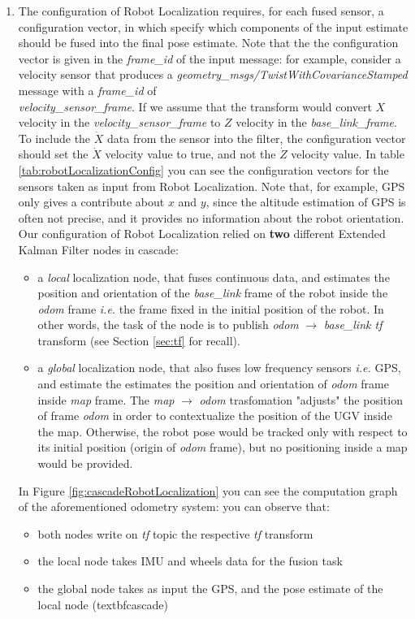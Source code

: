 \begin{enumerate}
	\item The configuration of Robot Localization requires, for each fused sensor, a configuration vector, in which specify which components of the input estimate should be fused into the final pose estimate. Note that the the configuration vector is given in the \textit{frame\_id} of the input message: for example, consider a velocity sensor that produces a \textit{geometry\_msgs/TwistWithCovarianceStamped} message with a \textit{frame\_id} of \\ \textit{velocity\_sensor\_frame}. If we assume that the transform would convert $X$ velocity in the \textit{velocity\_sensor\_frame} to $Z$ velocity in the \textit{base\_link\_frame}. To include the $\dot{X}$ data from the sensor into the filter, the configuration vector should set the $\dot{X}$ velocity value to true, and not the $\dot{Z}$ velocity value. In table \ref{tab:robotLocalizationConfig} you can see the configuration vectors for the sensors taken as input from Robot Localization. Note that, for example, GPS only gives a contribute about $x$ and $y$, since the altitude estimation of GPS is often not precise, and it provides no information about the robot orientation. Our configuration of Robot Localization relied on \textbf{two} different Extended Kalman Filter nodes in cascade:
	\begin{itemize}
		\item a \textit{local} localization node, that fuses continuous data, and estimates the position and orientation of the \textit{base\_link} frame of the robot inside the \textit{odom} frame \textit{i.e.} the frame fixed in the initial position of the robot. In other words, the task of the node is to publish \textit{odom} $\rightarrow$ \textit{base\_link tf} transform (see Section \ref{sec:tf} for recall). 
		\item a \textit{global} localization node, that also fuses low frequency sensors \textit{i.e.} GPS, and estimate the estimates the position and orientation of \textit{odom} frame inside \textit{map} frame. The \textit{map} $\rightarrow$ \textit{odom} trasfomation "adjusts" the position of frame \textit{odom} in order to contextualize the position of the \ac{UGV} inside the map. Otherwise, the robot pose would be tracked only with respect to its initial position (origin of \textit{odom} frame), but no positioning inside a map would be provided.
 	\end{itemize}
In Figure \ref{fig:cascadeRobotLocalization} you can see the computation graph of the aforementioned odometry system: you can observe that:
	\begin{itemize}
		\item both nodes write on \textit{tf} topic the respective \textit{tf} transform
		\item the local node takes \ac{IMU} and wheels data for the fusion task
		\item the global node takes as input the GPS, and the pose estimate of the local node (textbf{cascade})
	\end{itemize}


\end{enumerate}
